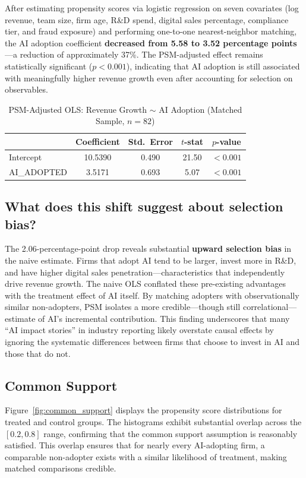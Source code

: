 \documentclass[12pt]{article}
\begin{document}
After estimating propensity scores via logistic regression on seven covariates (log revenue, team size, firm age, R\&D spend, digital sales percentage, compliance tier, and fraud exposure) and performing one-to-one nearest-neighbor matching, the AI adoption coefficient \textbf{decreased from 5.58 to 3.52 percentage points}---a reduction of approximately 37\%. The PSM-adjusted effect remains statistically significant ($p < 0.001$), indicating that AI adoption is still associated with meaningfully higher revenue growth even after accounting for selection on observables.

\begin{table}[H]
\centering
\caption{PSM-Adjusted OLS: Revenue Growth $\sim$ AI Adoption (Matched Sample, $n = 82$)}
\begin{tabular}{lcccc}
\toprule
 & Coefficient & Std.\ Error & $t$-stat & $p$-value \\
\midrule
Intercept & 10.5390 & 0.490 & 21.50 & $< 0.001$ \\
AI\_ADOPTED & 3.5171 & 0.693 & 5.07 & $< 0.001$ \\
\bottomrule
\end{tabular}
\end{table}

\subsection{What does this shift suggest about selection bias?}

The 2.06-percentage-point drop reveals substantial \textbf{upward selection bias} in the naive estimate. Firms that adopt AI tend to be larger, invest more in R\&D, and have higher digital sales penetration---characteristics that independently drive revenue growth. The naive OLS conflated these pre-existing advantages with the treatment effect of AI itself. By matching adopters with observationally similar non-adopters, PSM isolates a more credible---though still correlational---estimate of AI's incremental contribution. This finding underscores that many ``AI impact stories'' in industry reporting likely overstate causal effects by ignoring the systematic differences between firms that choose to invest in AI and those that do not.

\subsection{Common Support}

Figure~\ref{fig:common_support} displays the propensity score distributions for treated and control groups. The histograms exhibit substantial overlap across the $[0.2, 0.8]$ range, confirming that the common support assumption is reasonably satisfied. This overlap ensures that for nearly every AI-adopting firm, a comparable non-adopter exists with a similar likelihood of treatment, making matched comparisons credible.
\end{document}
